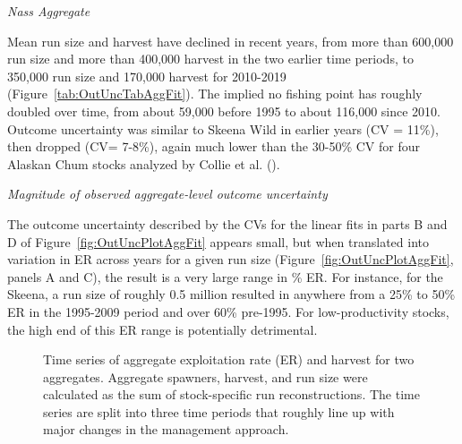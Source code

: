 \documentclass[french,11pt]{book}
\begin{document}
\emph{Nass Aggregate}

Mean run size and harvest have declined in recent years, from more than 600,000 run size and more than 400,000 harvest in the two earlier time periods, to 350,000 run size and 170,000 harvest for 2010-2019 (Figure~\ref{tab:OutUncTabAggFit}). The implied no fishing point has roughly doubled over time, from about 59,000 before 1995 to about 116,000 since 2010. Outcome uncertainty was similar to Skeena Wild in earlier years (CV = 11\%), then dropped (CV= 7-8\%), again much lower than the 30-50\% CV for four Alaskan Chum stocks analyzed by Collie et al. ().

\emph{Magnitude of observed aggregate-level outcome uncertainty}

The outcome uncertainty described by the CVs for the linear fits in parts B and D of Figure~\ref{fig:OutUncPlotAggFit} appears small, but when translated into variation in ER across years for a given run size (Figure~\ref{fig:OutUncPlotAggFit}, panels A and C), the result is a very large range in \% ER. For instance, for the Skeena, a run size of roughly 0.5 million resulted in anywhere from a 25\% to 50\% ER in the 1995-2009 period and over 60\% pre-1995. For low-productivity stocks, the high end of this ER range is potentially detrimental.

\clearpage


\begin{figure}[htb]

{\centering {} 

}

\caption{Time series of aggregate exploitation rate (ER) and harvest for two aggregates. Aggregate spawners, harvest, and run size were calculated as the sum of stock-specific run reconstructions. The time series are split into three time periods that roughly line up with major changes in the management approach.}\label{fig:OutUncPlotAggErHarv}
\end{figure}
\clearpage
\end{document}
